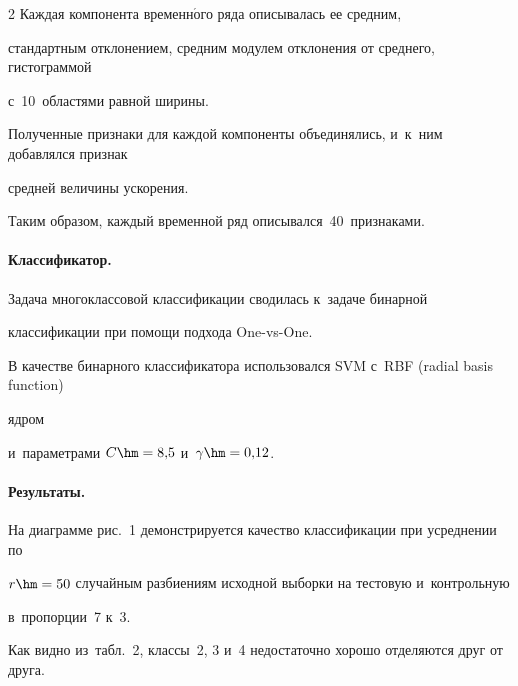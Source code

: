 \begin{multicols}{2}
Каждая компонента вре\-мен\-н$\acute{\mbox{о}}$\-го ряда описывалась ее средним, 


стандартным отклонением, средним модулем отклонения от среднего, гистограммой 


с~10~областями равной \mbox{ширины}.


Полученные признаки для каждой компоненты объединялись, и~к~ним добавлялся признак 


средней величины ускорения.


Таким образом, каждый временной ряд описывался~40~признаками.








\vspace*{-12pt}





\paragraph*{Классификатор.}


Задача многоклассовой классификации сводилась к~задаче бинарной 


классификации при помощи подхода One-vs-One.


В качестве бинарного классификатора использовался SVM с~RBF (radial basis function)


яд\-ром 


и~па\-ра\-мет\-ра\-ми $C\hm=8{,}5$ и~$\gamma\hm=0{,}12$.





\vspace*{-12pt}





\paragraph*{Результаты.}


На диаграмме рис.~1 демонстрируется качество классификации при усреднении по 


$r\hm=50$  случайным разбиениям исходной выборки на тес\-то\-вую и~контрольную 


в~пропорции~7 к~3.

















Как видно из~табл.~2, классы~2, 3 и~4 недостаточно хорошо отделяются друг от друга.





\pagebreak





\end{multicols}


